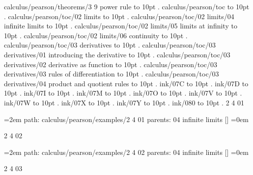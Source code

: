 \smallskip
calculus/pearson/theorems/3 9 power rule \leaders\hbox to 10pt {\hss.\hss}  \hfill {}
\smallskip
calculus/pearson/toc \leaders\hbox to 10pt {\hss.\hss}  \hfill {}
\smallskip
calculus/pearson/toc/02 limits \leaders\hbox to 10pt {\hss.\hss}  \hfill {}
\smallskip
calculus/pearson/toc/02 limits/04 infinite limits \leaders\hbox to 10pt {\hss.\hss}  \hfill {}
\smallskip
calculus/pearson/toc/02 limits/05 limits at infinity \leaders\hbox to 10pt {\hss.\hss}  \hfill {}
\smallskip
calculus/pearson/toc/02 limits/06 continuity \leaders\hbox to 10pt {\hss.\hss}  \hfill {}
\smallskip
calculus/pearson/toc/03 derivatives \leaders\hbox to 10pt {\hss.\hss}  \hfill {}
\smallskip
calculus/pearson/toc/03 derivatives/01 introducing the derivative \leaders\hbox to 10pt {\hss.\hss}  \hfill {}
\smallskip
calculus/pearson/toc/03 derivatives/02 derivative as function \leaders\hbox to 10pt {\hss.\hss}  \hfill {}
\smallskip
calculus/pearson/toc/03 derivatives/03 rules of differentiation \leaders\hbox to 10pt {\hss.\hss}  \hfill {}
\smallskip
calculus/pearson/toc/03 derivatives/04 product and quotient rules \leaders\hbox to 10pt {\hss.\hss}  \hfill {}
\smallskip
ink/07C \leaders\hbox to 10pt {\hss.\hss}  \hfill {}
\smallskip
ink/07D \leaders\hbox to 10pt {\hss.\hss}  \hfill {}
\smallskip
ink/07I \leaders\hbox to 10pt {\hss.\hss}  \hfill {}
\smallskip
ink/07M \leaders\hbox to 10pt {\hss.\hss}  \hfill {}
\smallskip
ink/07O \leaders\hbox to 10pt {\hss.\hss}  \hfill {}
\smallskip
ink/07V \leaders\hbox to 10pt {\hss.\hss}  \hfill {}
\smallskip
ink/07W \leaders\hbox to 10pt {\hss.\hss}  \hfill {}
\smallskip
ink/07X \leaders\hbox to 10pt {\hss.\hss}  \hfill {}
\smallskip
ink/07Y \leaders\hbox to 10pt {\hss.\hss}  \hfill {}
\smallskip
ink/080 \leaders\hbox to 10pt {\hss.\hss}  \hfill {}
\smallskip
\vfill \break
{}
2 4 01
\smallskip
\par\begingroup
\leftskip=2em
path: calculus/pearson/examples/2 4 01
\smallskip
parents:  04 infinite limits []
\smallskip
\leftskip=0em
\par\endgroup
\bigskip
{}
2 4 02
\smallskip
\par\begingroup
\leftskip=2em
path: calculus/pearson/examples/2 4 02
\smallskip
parents:  04 infinite limits []
\smallskip
\leftskip=0em
\par\endgroup
\bigskip
{}
2 4 03
\smallskip
\par\begingroup
